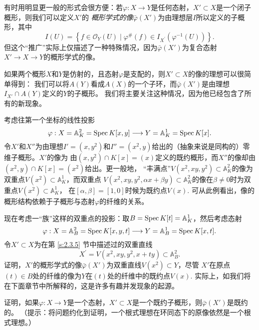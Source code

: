 有时用明显更一般的形式会很方便：若$\varphi: X\to Y$是任何态射，$X'\subset X$是一个闭子概形，则我们可以定义$X'$的
\textit{概形学式的像}$\bar\varphi(X')$为由理想层$I$所以定义的子概形，其中
\[
    I(U)=\left\{f \in \mathscr{O}_Y(U) \mid \varphi^{\#}(f) \in I_{X^{\prime}}\left(\varphi^{-1}(U)\right)\right\}.
\]%
但这个“推广”实际上仅描述了一种特殊情况，因为$\bar\varphi(X')$为复合态射$X'\to X\to Y$的概形学式的像。

如果两个概形$X$和$Y$是仿射的，且态射$\varphi$是支配的，则$X'\subset X$的像的理想可以很简单得到：
我们可以将$A(Y)$看成$A(X)$的一个子环，而$\bar\varphi(X')$是由理想$I_{X'}\cap A(Y)$定义的$Y$的子概形。
我们将主要关注这种情况，因为他已经包含了所有的新现象。

考虑往第一个坐标的线性投影
\[
    \varphi: X=\mathbb{A}_K^2=\operatorname{Spec} K[x, y] \longrightarrow Y=\mathbb{A}_K^1=\operatorname{Spec} K[x].
\]
令$X'$和$X''$为由理想$I'=(x,y^2)$和$I''=(x^2,y)$给出的（抽象来说是同构的）零维子概形。$X'$的像为
由$(x,y^2)\cap K[x]=(x)$定义的既约概形，而$X''$的像却由$(x^2,y)\cap K[x]=(x^2)$给出。更一般地，
“丰满点”$V(x^2,xy,y^2)\subset \mathbb A_K^2$的像为双重点$V(x^2)\subset \mathbb A_K^1$，而双重点
$V(x^2,xy,y^2,\alpha x+\beta y)\subset \mathbb A_K^2$的像在$\beta\neq 0$时为双重点$V(x^2)\subset \mathbb A_K^1$，
在$[\alpha,\beta]=[1,0]$时候为既约点$V(x)$. 可从此例看出，像的概形结构依赖于子概形与态射$\varphi$的纤维的关系。


\begin{exe}\label{exe:5.4}
    现在考虑一“族”这样的双重点的投影：取$B=\operatorname{Spec} K[t]=\mathbb A_K^1$，然后考虑态射
    \[
        \varphi: X=\mathbb{A}_B^2=\operatorname{Spec} K[x, y, t] \longrightarrow Y=\mathbb{A}_B^1=\operatorname{Spec} K[x, t].
    \]
    令$X'\subset X$为在第 \ref{s:2.3.5} 节中描述过的双重直线
    \[
        X^{\prime}=V\left(x^2, x y, y^2, x+t y\right) \subset \mathbb{A}_B^2.
    \]
    证明，$X'$的概形学式的像$\bar\varphi(X')$为双重直线$V(x^2)\subset Y$，尽管
    $X'$在原点$(t)\in B$处的纤维的像为$Y$在$(t)$处的纤维中的既约点$V(x)$.
    实际上，如我们将在下面章节中所解释的，这是许多有趣并发现象的起源。
\end{exe}


\begin{exe}\label{exe:5.5}
    证明，如果$\varphi:X\to Y$是一个态射，$X'\subset X$是一个既约子概形，则$\bar\varphi(X')$是既约的。
    （提示：将问题约化到证明，一个根式理想在环同态下的原像依然是一个根式理想。）
\end{exe}

